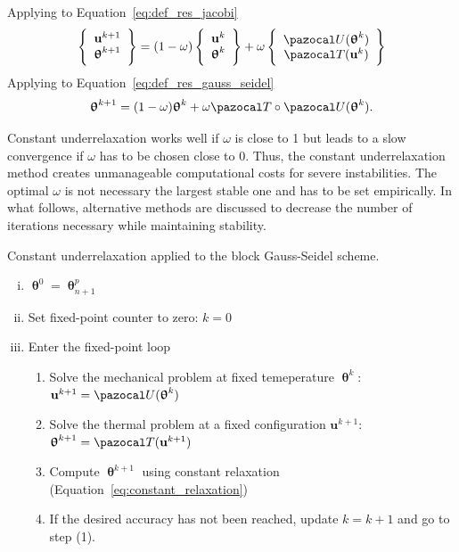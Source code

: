 Applying to Equation~\eqref{eq:def_res_jacobi}
\begin{equation}
  \left\{\begin{array}{c}
    \mathbf u^{k+1}\\
    \bm \uptheta^{k+1}
  \end{array}\right\} =
  (1-\omega)
  \left\{\begin{array}{c}
    \mathbf u^{k}\\
    \bm \uptheta^{k}
  \end{array}\right\}
  + \omega
  \left\{\begin{array}{c}
    \pazocal U(\bm\uptheta^k)\\
    \pazocal T(\mathbf u^k)
  \end{array}\right\}
\end{equation}
Applying to Equation~\eqref{eq:def_res_gauss_seidel}
\begin{equation}
  \bm\uptheta^{k+1} = (1-\omega)\bm\uptheta^k + \omega \pazocal T\circ\pazocal U(\bm \uptheta^k).
\end{equation}


Constant underrelaxation works well if \(\omega\) is close to 1 but leads to a slow convergence if \(\omega\) has to be chosen close to 0.
Thus, the constant underrelaxation method creates unmanageable computational costs for severe instabilities.
The optimal \(\omega\) is not necessary the largest stable one \citep{gatzhammer_efficient_2014} and has to be set empirically.
In what follows, alternative methods are discussed to decrease the number of iterations necessary while maintaining stability.

\begin{framedbox}[htb]
  \caption{Constant underrelaxation applied to the block Gauss-Seidel scheme.}
  \label{box:constant_underrelaxation}
  \begin{center}
    \begin{minipage}{0.9\textwidth}
    \begin{enumerate}[(i)]
    \item \(\bm\uptheta^0 = \bm\uptheta_{n+1}^p\)
    \item Set fixed-point counter to zero: \(k=0\)
    \item Enter the fixed-point loop
    \begin{enumerate}[(1)]
      \item Solve the mechanical problem at fixed temeperature \(\bm \uptheta^k\): \(\mathbf u^{k+1} = \pazocal U(\bm \uptheta^k)\)
      \item Solve the thermal problem at a fixed configuration \(\mathbf u^{k+1}\): \(\bm \uptheta^{k+1} = \pazocal T(\mathbf u^{k+1})\)
      \item Compute \(\bm \uptheta^{k+1}\) using constant relaxation (Equation~\eqref{eq:constant_relaxation})
      \item If the desired accuracy has not been reached, update \(k=k+1\) and go to step (1).
    \end{enumerate}
    \end{enumerate}
    \end{minipage}
  \end{center}
\end{framedbox}

